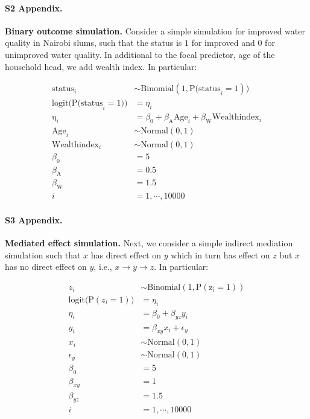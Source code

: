 \documentclass[10pt,letterpaper]{article}
\begin{document}
\paragraph*{S2 Appendix.}
\label{S2_Appendix}
{\bf Binary outcome simulation.} Consider a simple simulation for improved water quality in Nairobi slums, such that the status is $1$ for improved and $0$ for unimproved water quality. In additional to the focal predictor, age of the household head, we add wealth index. In particular:

\begin{align}\label{sim:glm_two_pred}
\mathrm{status}_i &\sim \mathrm{Binomial}(1, \mathrm{P(status}_i = 1)) \nonumber\\
\mathrm{logit(P(status}_i = 1)) &= \eta_i \nonumber\\
\mathrm{\eta}_i &= \beta_0 + \beta_{\mathrm{A}}\mathrm{Age}_i + \beta_{\mathrm{W}}\mathrm{Wealthindex}_i \nonumber\\
\mathrm{Age}_i &\sim \mathrm{Normal}(0, 1) \nonumber\\
\mathrm{Wealthindex}_i &\sim \mathrm{Normal}(0, 1) \nonumber\\
\beta_0 &= 5 \nonumber\\
\beta_{\mathrm{A}} &= 0.5 \nonumber\\
\beta_{\mathrm{W}} &= 1.5 \nonumber\\
i &= 1,\cdots, 10000
\end{align}

\paragraph*{S3 Appendix.}
\label{S3_Appendix}
{\bf Mediated effect simulation.} Next, we consider a simple indirect mediation simulation such that $x$ has direct effect on $y$ which in turn has effect on $z$ but $x$ has no direct effect on $y$, i.e., $x \rightarrow y \rightarrow z$. In particular:

\begin{align}\label{sim:simple_mediate}
z_i &\sim \mathrm{Binomial(1, P(z_i = 1))} \nonumber\\
\mathrm{logit(P}(z_i = 1)) &= \eta_i \nonumber\\
\eta_i &= \beta_0 + \beta_{yz} y_i \nonumber\\
y_i &= \beta_{xy} x_i + \epsilon_y \nonumber\\
x_i &\sim \mathrm{Normal(0, 1)} \nonumber\\
\epsilon_y &\sim \mathrm{Normal(0, 1)} \nonumber\\
\beta_0 &= 5 \nonumber\\
\beta_{xy} &= 1 \nonumber\\
\beta_{yz} &= 1.5 \nonumber\\
i &= 1,\cdots, 10000
\end{align}
\end{document}
